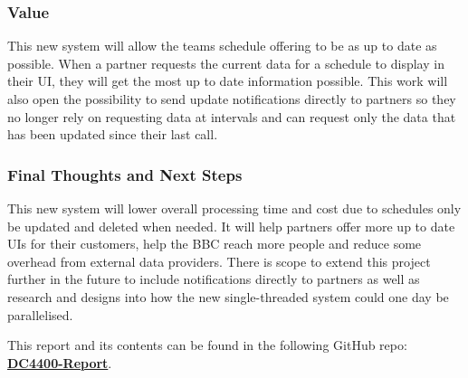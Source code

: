 \subsubsection*{Value}
This new system will allow the teams schedule offering to be as up to date as possible. When a partner requests the current data for a schedule to display in 
their UI, they will get the most up to date information possible. This work will also open the possibility to send update notifications directly to partners
so they no longer rely on requesting data at intervals and can request only the data that has been updated since their last call.

\subsubsection*{Final Thoughts and Next Steps}
This new system will lower overall processing time and cost due to schedules only be updated and deleted when needed. It will help partners offer more up to 
date UIs for their customers, help the BBC reach more people and reduce some overhead from external data providers. There is scope to extend this project 
further in the future to include notifications directly to partners as well as research and designs into how the new single-threaded system could one day 
be parallelised.

\vspace{0.2cm}
\noindent This report and its contents can be found in the following GitHub repo: \href{https://github.com/OMBowkerBBC/DC4400-Report}{\textbf{DC4400-Report}}.

\newpage
